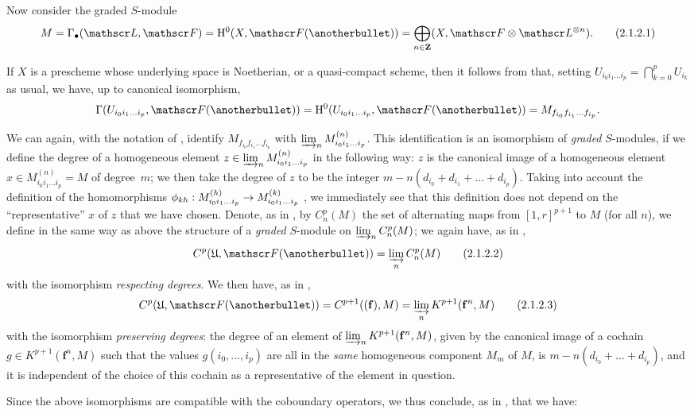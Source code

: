 \begin{env}[2.1.2]
\label{III.2.1.2}
Now consider the graded $S$-module 
\[
\label{III.2.1.2.1}
  M = \Gamma_\bullet(\sh{L},\sh{F}) = \HH^0(X,\sh{F}(\anotherbullet)) = \bigoplus_{n\in\bb{Z}}(X,\sh{F}\otimes\sh{L}^{\otimes n}).
\tag{2.1.2.1}
\]

If $X$ is a prescheme whose underlying space is Noetherian, or a quasi-compact scheme, then it follows from  that, setting $U_{i_0i_1\ldots i_p}=\bigcap_{k=0}^p U_{i_k}$ as usual, we have, up to canonical isomorphism,
\[
  \Gamma(U_{i_0i_1\ldots i_p}, \sh{F}(\anotherbullet))
  = \HH^0(U_{i_0i_1\ldots i_p}, \sh{F}(\anotherbullet))
  = M_{f_{i_0}f_{i_1}\ldots f_{i_p}}.
\]

We can again, with the notation of , identify $M_{f_{i_0}f_{i_1}\ldots f_{i_p}}$ with $\varinjlim_n M_{i_0i_1\ldots i_p}^{(n)}$.
This identification is an isomorphism of \emph{graded} $S$-modules, if we define the degree of a homogeneous element $z\in\varinjlim_n M_{i_0i_1\ldots i_p}^{(n)}$ in the following way:
$z$ is the canonical image of a homogeneous element $x\in M_{i_0i_1\ldots i_p}^{(n)}=M$ of degree~$m$;
we then take the degree of $z$ to be the integer $m-n(d_{i_0}+d_{i_1}+\ldots+d_{i_p})$.
Taking into account the definition of the homomorphisms $\vphi_{kh}:M_{i_0i_1\ldots i_p}^{(h)}\to M_{i_0i_1\ldots i_p}^{(k)}$ , we immediately see that this definition does not depend on the ``representative'' $x$ of $z$ that we have chosen.
Denote, as in , by $C_n^p(M)$ the set of alternating maps from $[1,r]^{p+1}$ to $M$ (for all $n$), we define in the same way as above the structure of a \emph{graded} $S$-module on $\varinjlim_n C_n^p(M)$;
we again have, as in ,
\[
\label{III.2.1.2.2}
  C^p(\mathfrak{U}, \sh{F}(\anotherbullet))
  = \varinjlim_n C_n^p(M)
\tag{2.1.2.2}
\]
with the isomorphism \emph{respecting degrees}.
We then have, as in ,
\[
\label{III.2.1.2.3}
  C^p(\mathfrak{U}, \sh{F}(\anotherbullet))
  = C^{p+1}((\mathbf{f}), M)
  = \varinjlim_n K^{p+1}(\mathbf{f}^n, M)
\tag{2.1.2.3}
\]
with the isomorphism \emph{preserving degrees}:
the degree of an element of $\varinjlim_n K^{p+1}(\mathbf{f}^n, M)$, given by the canonical image of a cochain $g\in K^{p+1}(\mathbf{f}^n,M)$ such that the values $g(i_0,\ldots,i_p)$ are all in the \emph{same} homogeneous component $M_m$ of $M$, is $m-n(d_{i_0}+\ldots+d_{i_p})$, and it is independent of the choice of this cochain as a representative of the element in question.

Since the above isomorphisms are compatible with the coboundary operators, we thus conclude, as in , that we have:
\end{env}

